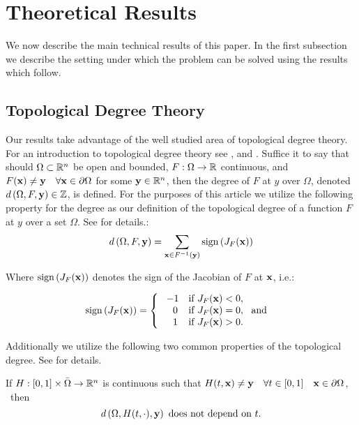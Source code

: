 \section{Theoretical Results} \label{sec:theory}  
We now describe the main technical results of this paper. 
In the first subsection we describe the setting under which the problem can be solved using the results which follow. 
\subsection{Topological Degree Theory}
Our results take advantage of the well studied area of topological degree theory. 
For an introduction to topological degree theory see \cite{OrChCh2006}, \cite{fonseca1995degree} and \cite{MoVrYa2002}. 
Suffice it to say that should $\Omega\subset\mathbb{R}^{n}$ be open and bounded, $F:\Omega\rightarrow \mathbb{R}$ continuous, and $F(\mathbf{x}) \neq \mathbf{y} \quad \forall \mathbf{x}\in\partial\Omega$ for some $\mathbf{y}\in\mathbb{R}^n$, then the degree of $F$ at $y$ over $\Omega$, denoted $d\left(\Omega,F,\mathbf{y}\right)\in\mathbb{Z}$, is defined. 
For the purposes of this article we utilize the following property for the degree as our definition of the topological degree of a function $F$ at $y$ over a set $\Omega$. 
See \cite{OrChCh2006} for details.:
\begin{equation}\label{eq:Deg3}
d\left(\Omega,F,\mathbf{y}\right)=\sum\limits_{\mathbf{x}\in F^{-1}(\mathbf{y})}\operatorname{sign}\left(J_F(\mathbf{x})\right)
\end{equation}

Where $\operatorname{sign}\left(J_F(\mathbf{x})\right)$ denotes the sign of the Jacobian of $F$ at $\mathbf{x}$, i.e.:

\[\operatorname{sign}\left(J_F(\mathbf{x})\right)=   \left\{
\begin{array}{ll}
       \ -1   & \mbox{if } J_F(\mathbf{x})< 0, \\
      \quad 0 & \mbox{if } J_F(\mathbf{x})= 0,~\mbox{ and } \\
      \quad 1 & \mbox{if } J_F(\mathbf{x})> 0. \\
\end{array} 
\right. \]

Additionally we utilize the following two common properties of the topological degree. 
See \cite{OrChCh2006} for details. 

If $H : [0,1]\times\bar{\Omega}\rightarrow\mathbb{R}^n$ is continuous such that $H(t,\mathbf{x})\neq \mathbf{y} \quad \forall t\in[0,1]\quad \mathbf{x}\in\partial\Omega$,   \ then 
\begin{equation}\label{eq:Deg1} 
d\left(\Omega,H(t,\cdot),\mathbf{y}\right)\text{ does not depend on }t.
\end{equation}

